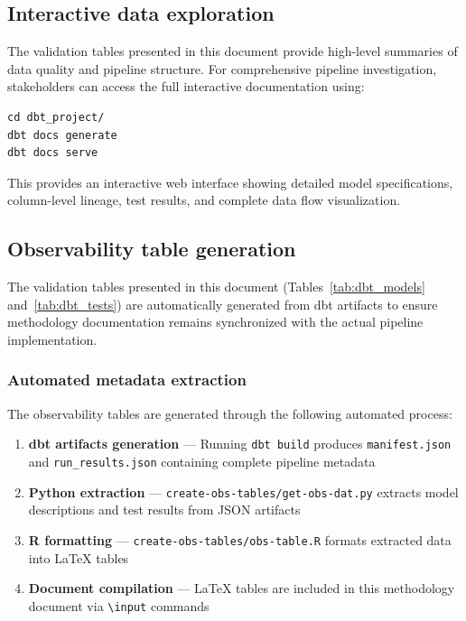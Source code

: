 \documentclass{article}
\begin{document}
\subsection{Interactive data exploration}

The validation tables presented in this document provide high-level summaries of data quality and pipeline structure. For comprehensive pipeline investigation, stakeholders can access the full interactive documentation using:

\begin{verbatim}
cd dbt_project/
dbt docs generate
dbt docs serve
\end{verbatim}

This provides an interactive web interface showing detailed model specifications, column-level lineage, test results, and complete data flow visualization.

\subsection{Observability table generation}
\label{subsec:obs-table-gen}

The validation tables presented in this document (Tables~\ref{tab:dbt_models} and~\ref{tab:dbt_tests}) are automatically generated from dbt artifacts to ensure methodology documentation remains synchronized with the actual pipeline implementation.

\subsubsection{Automated metadata extraction}

The observability tables are generated through the following automated process:

\begin{enumerate}
    \item \textbf{dbt artifacts generation} — Running \texttt{dbt build} produces \texttt{manifest.json} and \texttt{run\_results.json} containing complete pipeline metadata
    \item \textbf{Python extraction} — \texttt{create-obs-tables/get-obs-dat.py} extracts model descriptions and test results from JSON artifacts
    \item \textbf{R formatting} — \texttt{create-obs-tables/obs-table.R} formats extracted data into LaTeX tables
    \item \textbf{Document compilation} — LaTeX tables are included in this methodology document via \texttt{\textbackslash input} commands
\end{enumerate}
\end{document}
